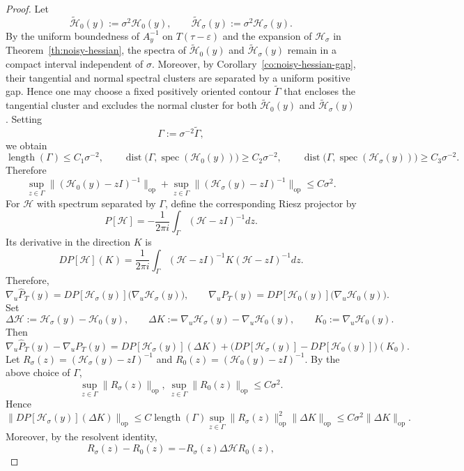\documentclass[10pt,a4paper]{amsart}
\begin{document}
\begin{proof}
Let
\[
\widetilde {\mathcal H}_0(y):=\sigma^2 \mathcal H_0(y),
\qquad
\widetilde {\mathcal H}_\sigma(y):=\sigma^2 \mathcal H_\sigma(y).
\]
By the uniform boundedness of $A_y^{-1}$ on $T(\tau-\varepsilon)$ and the expansion of $\mathcal H_\sigma$ in Theorem~\ref{th:noisy-hessian}, the spectra of $\widetilde {\mathcal H}_0(y)$ and $\widetilde {\mathcal H}_\sigma(y)$ remain in a compact interval independent of $\sigma$. Moreover, by Corollary~\ref{co:noisy-hessian-gap}, their tangential and normal spectral clusters are separated by a uniform positive gap.
Hence one may choose a fixed positively oriented contour $\widetilde\Gamma$ that encloses the tangential cluster and excludes the normal cluster for both $\widetilde {\mathcal H}_0(y)$ and $\widetilde {\mathcal H}_\sigma(y)$.
Setting
\[
\Gamma:=\sigma^{-2}\widetilde\Gamma,
\]
we obtain
\[
\operatorname{length}(\Gamma)\le C_1\sigma^{-2},
\qquad
\operatorname{dist}\big(\Gamma,\operatorname{spec}(\mathcal H_0(y))\big)\ge C_2\sigma^{-2},
\qquad
\operatorname{dist}\big(\Gamma,\operatorname{spec}(\mathcal H_\sigma(y))\big)\ge C_3\sigma^{-2}.
\]
Therefore
\[
\sup_{z\in\Gamma}\|(\mathcal H_0(y)-zI)^{-1}\|_{\mathrm{op}}
+
\sup_{z\in\Gamma}\|(\mathcal H_\sigma(y)-zI)^{-1}\|_{\mathrm{op}}
\le C\sigma^2.
\]
For $\mathcal H$ with spectrum separated by $\Gamma$, define the corresponding Riesz projector by
\[
P[\mathcal H]=-\frac{1}{2\pi i}\int_{\Gamma}(\mathcal H-zI)^{-1}dz.
\]
Its derivative in the direction $K$ is
\[
DP[\mathcal H](K)=\frac{1}{2\pi i}\int_{\Gamma}(\mathcal H-zI)^{-1}K(\mathcal H-zI)^{-1}dz.
\]
Therefore,
\[
\nabla_u\widehat P_T(y)
=
DP[\mathcal H_\sigma(y)]\big(\nabla_u\mathcal H_\sigma(y)\big),
\qquad
\nabla_uP_T(y)
=
DP[\mathcal H_0(y)]\big(\nabla_u\mathcal H_0(y)\big).
\]
Set
\[
\Delta \mathcal H:=\mathcal H_\sigma(y)-\mathcal H_0(y),
\qquad
\Delta K:=\nabla_u\mathcal H_\sigma(y)-\nabla_u\mathcal H_0(y),
\qquad
K_0:=\nabla_u\mathcal H_0(y).
\]
Then
\[
\nabla_u\widehat P_T(y)-\nabla_uP_T(y)
=
DP[\mathcal H_\sigma(y)](\Delta K)
+
\big(DP[\mathcal H_\sigma(y)]-DP[\mathcal H_0(y)]\big)(K_0).
\]
Let $R_\sigma(z)=(\mathcal H_\sigma(y)-zI)^{-1}$ and
$R_0(z)=(\mathcal H_0(y)-zI)^{-1}$. By the above choice of $\Gamma$,
\[
\sup_{z\in\Gamma}\|R_\sigma(z)\|_{\mathrm{op}}
,\ 
\sup_{z\in\Gamma}\|R_0(z)\|_{\mathrm{op}}
\le C\sigma^2.
\]
Hence
\[
\|DP[\mathcal H_\sigma(y)](\Delta K)\|_{\mathrm{op}}
\le
C\operatorname{length}(\Gamma)
\sup_{z\in\Gamma}\|R_\sigma(z)\|_{\mathrm{op}}^2
\|\Delta K\|_{\mathrm{op}}
\le
C\sigma^2\|\Delta K\|_{\mathrm{op}}.
\]
Moreover, by the resolvent identity,
\[
R_\sigma(z)-R_0(z)
=
-R_\sigma(z)\Delta \mathcal HR_0(z),
\]
\end{proof}
\end{document}
